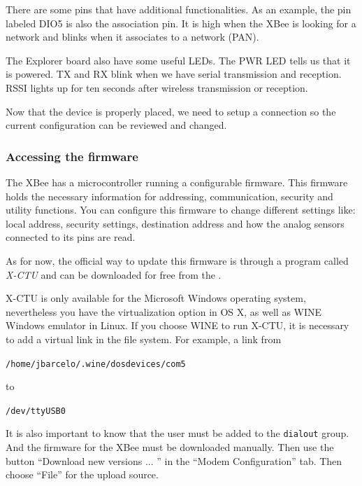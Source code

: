 There are some pins that have additional functionalities.
As an example, the pin labeled DIO5 is also the association pin.
It is high when the XBee is looking for a network and blinks when it associates to a network (PAN).

The Explorer board also have some useful LEDs.
The PWR LED tells us that it is powered.
TX and RX blink when we have serial transmission and reception.
RSSI lights up for ten seconds after wireless transmission or reception.

Now that the device is properly placed, we need to setup a connection so the current configuration can be reviewed and changed.

\subsubsection{Accessing the firmware}\label{xbeeRoleConfiguration}

The XBee has a microcontroller running a configurable firmware. This firmware holds the necessary information for addressing, communication, security and utility functions. You can configure this firmware to change different settings like: local address, security settings, destination address and how the analog sensors connected to its pins are read.

As for now, the official way to update this firmware is through a program called \emph{X-CTU} and can be downloaded for free from the \emph{}.

\emph{}

X-CTU is only available for the Microsoft Windows operating system, nevertheless you have the virtualization option in OS X, as well as WINE Windows emulator in Linux. 
If you choose WINE to run X-CTU, it is necessary to add a virtual link in the file system.
For example, a link from

\texttt{/home/jbarcelo/.wine/dosdevices/com5} 

to

\texttt{/dev/ttyUSB0}

It is also important to know that the user must be added to the \texttt{dialout} group.
And the firmware for the XBee must be downloaded manually.
Then use the button ``Download new versions ... '' in the ``Modem Configuration'' tab.
Then choose ``File'' for the upload source.

